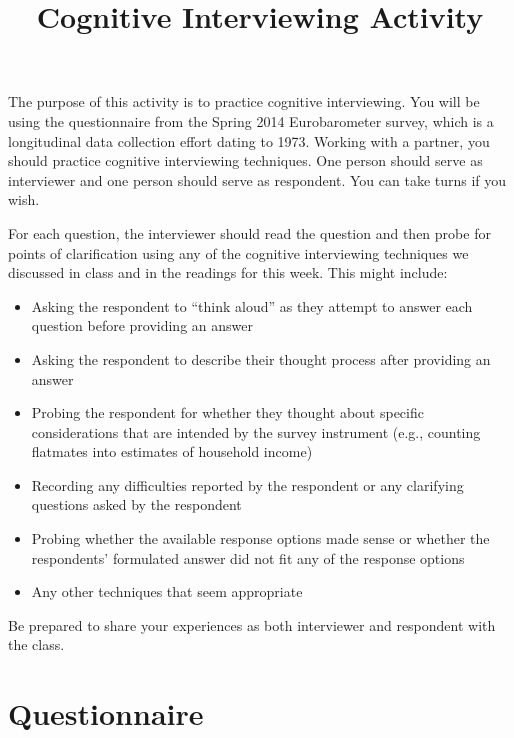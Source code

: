 \documentclass[12pt, a4]{article}
\title{Cognitive Interviewing Activity\vspace{-2em}}
\author{}
\date{}
\begin{document}
\maketitle

\onehalfspacing

\noindent The purpose of this activity is to practice cognitive interviewing. You will be using the questionnaire from the Spring 2014 Eurobarometer survey, which is a longitudinal data collection effort dating to 1973. Working with a partner, you should practice cognitive interviewing techniques. One person should serve as interviewer and one person should serve as respondent. You can take turns if you wish.

\vspace{1em}

\noindent For each question, the interviewer should read the question and then probe for points of clarification using any of the cognitive interviewing techniques we discussed in class and in the readings for this week. This might include:

\begin{itemize}
	\item Asking the respondent to ``think aloud'' as they attempt to answer each question before providing an answer
	\item Asking the respondent to describe their thought process after providing an answer
	\item Probing the respondent for whether they thought about specific considerations that are intended by the survey instrument (e.g., counting flatmates into estimates of household income)
	\item Recording any difficulties reported by the respondent or any clarifying questions asked by the respondent
	\item Probing whether the available response options made sense or whether the respondents' formulated answer did not fit any of the response options
	\item Any other techniques that seem appropriate
\end{itemize}

\noindent Be prepared to share your experiences as both interviewer and respondent with the class.



\vspace{1em}

\noindent 

\clearpage
\section*{Questionnaire}
\end{document}
